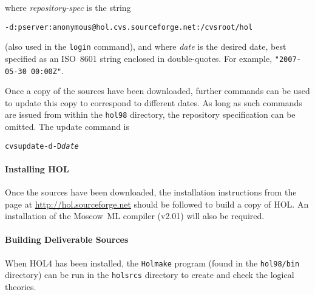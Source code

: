 \documentclass[11pt]{article}
\begin{document}
\noindent where \textit{\ttfamily repository-spec} is the string

{\small
\begin{alltt}
   -d:pserver:anonymous@hol.cvs.sourceforge.net:/cvsroot/hol
\end{alltt}
}

\noindent (also used in the \texttt{login} command), and where
\textit{\ttfamily date} is the desired date, best specified as an
ISO~8601 string enclosed in double-quotes.  For example,
\texttt{"2007-05-30 00:00Z"}.

Once a copy of the sources have been downloaded, further commands can
be used to update this copy to correspond to different dates.  As long
as such commands are issued from within the \texttt{hol98} directory,
the repository specification can be omitted.  The update command is

{\small
\begin{alltt}
   cvs update -d -D \textit{date}
\end{alltt}
}

\paragraph{Installing HOL} Once the sources have been downloaded, the
installation instructions from the page at
\url{http://hol.sourceforge.net} should be followed to build a copy of
HOL.  An installation of the Moscow~ML compiler (v2.01) will also be
required.

\paragraph{Building Deliverable Sources}
When HOL4 has been installed, the \texttt{Holmake} program (found in
the \texttt{hol98/bin} directory) can be run in the \texttt{holsrcs}
directory to create and check the logical theories.





\printindex
\end{document}
